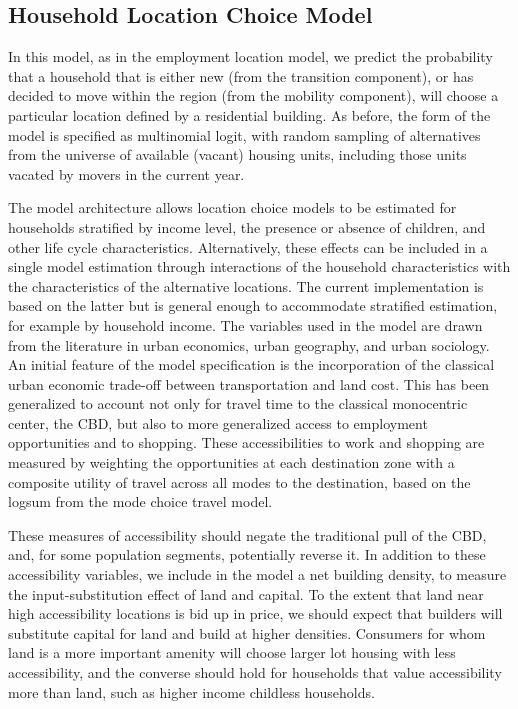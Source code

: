 \subsection{Household Location Choice Model}

In this model, as in the employment location model, we predict the
probability that a household that is either new (from the
transition component), or has decided to move within the region
(from the mobility component), will choose a particular location
defined by a residential building.  As before, the form of the model is
specified as multinomial logit, with random sampling of
alternatives from the universe of available (vacant) housing
units, including those units vacated by movers in the current
year.

The model architecture allows location choice models to be
estimated for households stratified by income level, the presence
or absence of children, and other life cycle characteristics.
Alternatively, these effects can be included in a single model
estimation through interactions of the household characteristics
with the characteristics of the alternative locations.  The
current implementation is based on the latter but is general
enough to accommodate stratified estimation, for example by
household income. The variables used in the model are drawn from
the literature in urban economics, urban geography, and urban
sociology.  An initial feature of the model specification is the
incorporation of the classical urban economic trade-off between
transportation and land cost. This has been generalized to account
not only for travel time to the classical monocentric center, the
CBD, but also to more generalized access to employment
opportunities and to shopping. These accessibilities to work and
shopping are measured by weighting the opportunities at each
destination zone with a composite utility of travel across all
modes to the destination, based on the logsum from the mode choice
travel model.

These measures of accessibility should negate the traditional pull
of the CBD, and, for some population segments, potentially reverse
it.  In addition to these accessibility variables, we include in
the model a net building density, to measure the
input-substitution effect of land and capital.  To the extent that
land near high accessibility locations is bid up in price, we
should expect that builders will substitute capital for land and
build at higher densities.  Consumers for whom land is a more
important amenity will choose larger lot housing with less
accessibility, and the converse should hold for households that
value accessibility more than land, such as higher income
childless households.

